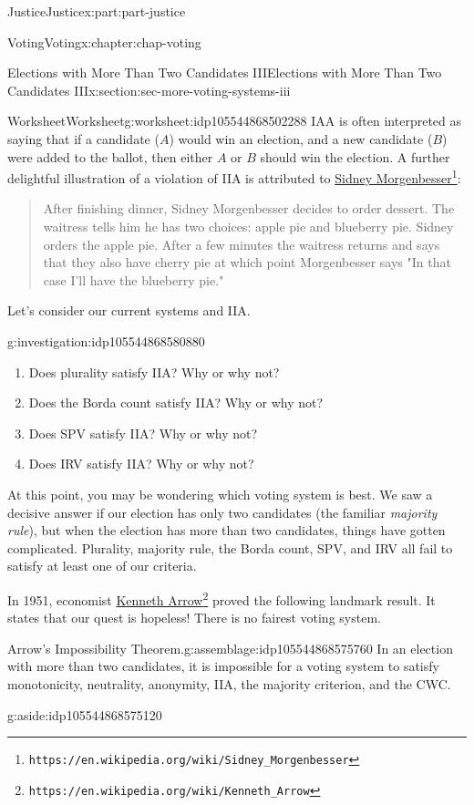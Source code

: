 \documentclass[oneside,10pt,]{book}
\numberwithin{equation}{section}
\begin{document}
\begin{partptx}{Justice}{}{Justice}{}{}{x:part:part-justice}
\begin{chapterptx}{Voting}{}{Voting}{}{}{x:chapter:chap-voting}
\begin{sectionptx}{Elections with More Than Two Candidates III}{}{Elections with More Than Two Candidates III}{}{}{x:section:sec-more-voting-systems-iii}
\begin{worksheet-subsection}{Worksheet}{}{Worksheet}{}{}{g:worksheet:idp105544868502288}
IAA is often interpreted as saying that if a candidate (\(A\)) would win an election, and a new candidate (\(B\)) were added to the ballot, then either \(A\) or \(B\) should win the election. A further delightful illustration of a violation of IIA is attributed to \href{https://en.wikipedia.org/wiki/Sidney_Morgenbesser}{Sidney Morgenbesser}\footnote{\nolinkurl{https://en.wikipedia.org/wiki/Sidney_Morgenbesser}\label{g:fn:idp105544868582928}}:%
\begin{quote}%
After finishing dinner, Sidney Morgenbesser decides to order dessert. The waitress tells him he has two choices: apple pie and blueberry pie. Sidney orders the apple pie. After a few minutes the waitress returns and says that they also have cherry pie at which point Morgenbesser says "In that case I'll have the blueberry pie."\end{quote}
Let's consider our current systems and IIA.%
\begin{investigation}{}{g:investigation:idp105544868580880}%
%
\begin{enumerate}[label=(\alph*)]
\item{}Does plurality satisfy IIA? Why or why not?%
\item{}Does the Borda count satisfy IIA? Why or why not?%
\item{}Does SPV satisfy IIA? Why or why not?%
\item{}Does IRV satisfy IIA? Why or why not?%
\end{enumerate}
\end{investigation}%
At this point, you may be wondering which voting system is best. We saw a decisive answer if our election has only two candidates (the familiar \emph{majority rule}), but when the election has more than two candidates, things have gotten complicated. Plurality, majority rule, the Borda count, SPV, and IRV all fail to satisfy at least one of our criteria.%
\par
In 1951, economist \href{https://en.wikipedia.org/wiki/Kenneth_Arrow}{Kenneth Arrow}\footnote{\nolinkurl{https://en.wikipedia.org/wiki/Kenneth_Arrow}\label{g:fn:idp105544868576912}} proved the following landmark result. It states that our quest is hopeless! There is no fairest voting system.%
\begin{assemblage}{Arrow's Impossibility Theorem.}{g:assemblage:idp105544868575760}%
In an election with more than two candidates, it is impossible for a voting system to satisfy monotonicity, neutrality, anonymity, IIA, the majority criterion, and the CWC. \begin{aside}{}{g:aside:idp105544868575120}%

\end{aside}
\end{assemblage}
\end{worksheet-subsection}
\end{sectionptx}
\end{chapterptx}
\end{partptx}
\end{document}
